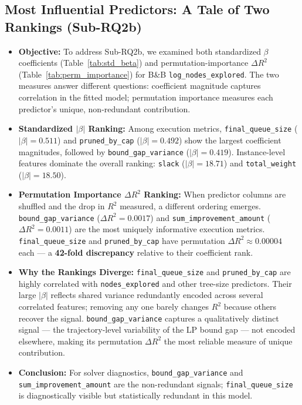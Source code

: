 \documentclass[sigconf]{acmart}
\begin{document}
\subsection{Most Influential Predictors: A Tale of Two Rankings (Sub-RQ2b)}\label{sec:predictors}
\begin{itemize}
  \item \textbf{Objective:} To address Sub-RQ2b, we examined both standardized $\beta$ coefficients (Table~\ref{tab:std_beta}) and permutation-importance $\Delta R^2$ (Table~\ref{tab:perm_importance}) for B\&B \texttt{log\_nodes\_explored}. The two measures answer different questions: coefficient magnitude captures correlation in the fitted model; permutation importance measures each predictor's unique, non-redundant contribution.
  \item \textbf{Standardized $|\beta|$ Ranking:} Among execution metrics, \texttt{final\_queue\_size} ($|\beta| = 0.511$) and \texttt{pruned\_by\_cap} ($|\beta| = 0.492$) show the largest coefficient magnitudes, followed by \texttt{bound\_gap\_variance} ($|\beta| = 0.419$). Instance-level features dominate the overall ranking: \texttt{slack} ($|\beta| = 18.71$) and \texttt{total\_weight} ($|\beta| = 18.50$).
  \item \textbf{Permutation Importance $\Delta R^2$ Ranking:} When predictor columns are shuffled and the drop in $R^2$ measured, a different ordering emerges. \texttt{bound\_gap\_variance} ($\Delta R^2 = 0.0017$) and \texttt{sum\_improvement\_amount} ($\Delta R^2 = 0.0011$) are the most uniquely informative execution metrics. \texttt{final\_queue\_size} and \texttt{pruned\_by\_cap} have permutation $\Delta R^2 \approx 0.00004$ each --- a \textbf{42-fold discrepancy} relative to their coefficient rank.
  \item \textbf{Why the Rankings Diverge:} \texttt{final\_queue\_size} and \texttt{pruned\_by\_cap} are highly correlated with \texttt{nodes\_explored} and other tree-size predictors. Their large $|\beta|$ reflects shared variance redundantly encoded across several correlated features; removing any one barely changes $R^2$ because others recover the signal. \texttt{bound\_gap\_variance} captures a qualitatively distinct signal --- the trajectory-level variability of the LP bound gap --- not encoded elsewhere, making its permutation $\Delta R^2$ the most reliable measure of unique contribution.
  \item \textbf{Conclusion:} For solver diagnostics, \texttt{bound\_gap\_variance} and \texttt{sum\_improvement\_amount} are the non-redundant signals; \texttt{final\_queue\_size} is diagnostically visible but statistically redundant in this model.
\end{itemize}
\end{document}
